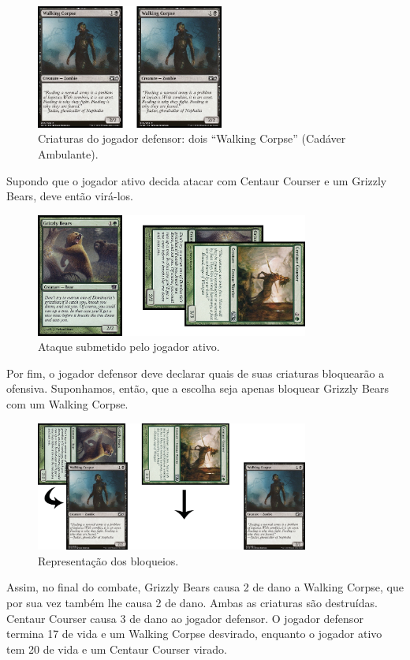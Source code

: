 \newpage

\begin{figure}[!h]
  \centering
  \includegraphics[width=0.55\textwidth]{picstcc/blk1.png}
  \caption{Criaturas do jogador defensor: dois ``Walking Corpse'' (Cadáver Ambulante).}
  \label{beginblock}
\end{figure}

Supondo que o jogador ativo decida atacar com Centaur Courser e um Grizzly Bears, deve então virá-los.

\begin{figure}[!h]
  \centering
  \includegraphics[width=0.8\textwidth]{picstcc/att2.png}
  \caption{Ataque submetido pelo jogador ativo.}
  \label{declaredattackers}
\end{figure}

\newpage

Por fim, o jogador defensor deve declarar quais de suas criaturas bloquearão a ofensiva. Suponhamos, então, que a escolha seja apenas bloquear Grizzly Bears com um Walking Corpse.

\begin{figure}[!h]
  \centering
  \includegraphics[width=0.8\textwidth]{picstcc/blk2.png}
  \caption{Representação dos bloqueios.}
  \label{declaredblockers}
\end{figure}

Assim, no final do combate, Grizzly Bears causa 2 de dano a Walking Corpse, que por sua vez também lhe causa 2 de dano. Ambas as criaturas são destruídas. Centaur Courser causa 3 de dano ao jogador defensor. O jogador defensor termina 17 de vida e um Walking Corpse desvirado, enquanto o jogador ativo tem 20 de vida e um Centaur Courser virado.
